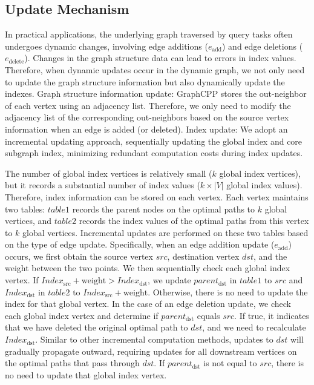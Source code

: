 \documentclass[lettersize,journal]{IEEEtran} %
\begin{document}
\subsection{Update Mechanism}
In practical applications, the underlying graph traversed by query tasks often undergoes dynamic changes, involving edge additions ($e_{\text{add}}$) and edge deletions ($e_{\text{delete}}$). Changes in the graph structure data can lead to errors in index values. Therefore, when dynamic updates occur in the dynamic graph, we not only need to update the graph structure information but also dynamically update the indexes. Graph structure information update: GraphCPP stores the out-neighbor of each vertex using an adjacency list. Therefore, we only need to modify the adjacency list of the corresponding out-neighbors based on the source vertex information when an edge is added (or deleted). Index update: We adopt an incremental updating approach, sequentially updating the global index and core subgraph index, minimizing redundant computation costs during index updates.

The number of global index vertices is relatively small ($k$ global index vertices), but it records a substantial number of index values ($k \times |V|$ global index values). Therefore, index information can be stored on each vertex. Each vertex maintains two tables: $table1$ records the parent nodes on the optimal paths to $k$ global vertices, and $table2$ records the index values of the optimal paths from this vertex to $k$ global vertices. Incremental updates are performed on these two tables based on the type of edge update. Specifically, when an edge addition update ($e_{\text{add}}$) occurs, we first obtain the source vertex $src$, destination vertex $dst$, and the weight between the two points. We then sequentially check each global index vertex. If $Index_{\text{src}} + \text{weight} > Index_{\text{dst}}$, we update $parent_{\text{dst}}$ in $table1$ to $src$ and $Index_{\text{dst}}$ in $table2$ to $Index_{\text{src}} + \text{weight}$. Otherwise, there is no need to update the index for that global vertex. In the case of an edge deletion update, we check each global index vertex and determine if $parent_{\text{dst}}$ equals $src$. If true, it indicates that we have deleted the original optimal path to $dst$, and we need to recalculate $Index_{\text{dst}}$. Similar to other incremental computation methods, updates to $dst$ will gradually propagate outward, requiring updates for all downstream vertices on the optimal paths that pass through $dst$. If $parent_{\text{dst}}$ is not equal to $src$, there is no need to update that global index vertex.
\end{document}
